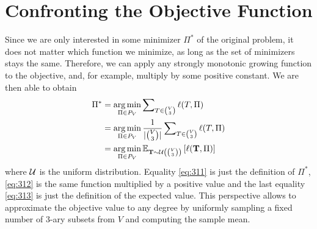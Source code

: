 \section{Confronting the Objective Function}\label{sec:objective-function}
Since we are only interested in some minimizer $\Pi^*$ of the original problem, it does not matter which function we minimize, as long as the set of minimizers stays the same. Therefore, we can apply any strongly monotonic growing function to the objective, and, for example, multiply by some positive constant. We are then able to obtain
\begin{align}
    \Pi^* &= \operatorname*{\arg\min}_{\Pi \in P_V} \sum\nolimits_{T\in\binom{V}{3}} \ell(T,\Pi) \label{eq:311} \\
    &= \operatorname*{\arg\min}_{\Pi \in P_V} \frac{1}{|\binom{V}{3}|} \sum\nolimits_{T\in\binom{V}{3}} \ell(T,\Pi) \label{eq:312} \\
    &= \operatorname*{\arg\min}_{\Pi \in P_V} \mathbb{E}_{{\bf T} \sim \mathcal{U}\left(\binom{V}{3}\right)} \left[\ell({\bf T}, \Pi)\right] \label{eq:313}
\end{align}
where $\mathcal{U}$ is the uniform distribution. Equality \eqref{eq:311} is just the definition of $\Pi^*$, \eqref{eq:312} is the same function multiplied by a positive value and the last equality \eqref{eq:313} is just the definition of the expected value. This perspective allows to approximate the objective value to any degree by uniformly sampling a fixed number of $3$-ary subsets from $V$ and computing the sample mean.

